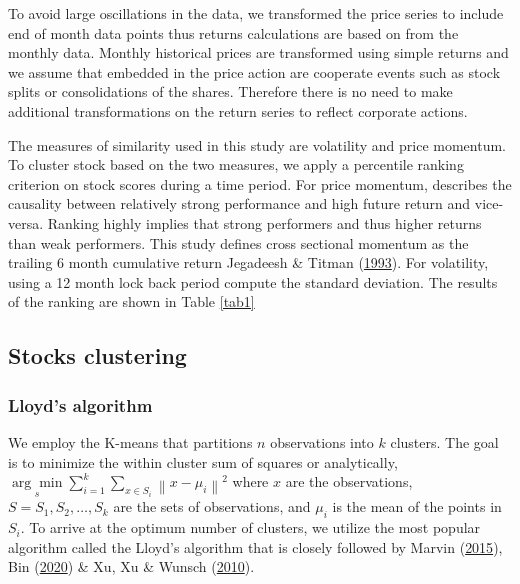 \documentclass[11pt,preprint, authoryear]{elsarticle}
\numberwithin{equation}{section}
\numberwithin{figure}{section}
\numberwithin{table}{section}
\begin{document}
To avoid large oscillations in the data, we transformed the price series
to include end of month data points thus returns calculations are based
on from the monthly data. Monthly historical prices are transformed
using simple returns and we assume that embedded in the price action are
cooperate events such as stock splits or consolidations of the shares.
Therefore there is no need to make additional transformations on the
return series to reflect corporate actions.

The measures of similarity used in this study are volatility and price
momentum. To cluster stock based on the two measures, we apply a
percentile ranking criterion on stock scores during a time period. For
price momentum, describes the causality between relatively strong
performance and high future return and vice-versa. Ranking highly
implies that strong performers and thus higher returns than weak
performers. This study defines cross sectional momentum as the trailing
6 month cumulative return Jegadeesh \& Titman
(\protect\hyperlink{ref-jegadeesh1993returns}{1993}). For volatility,
using a 12 month lock back period compute the standard deviation. The
results of the ranking are shown in Table \ref{tab1}

\hypertarget{stocks-clustering}{%
\subsection{Stocks clustering}\label{stocks-clustering}}

\hypertarget{lloyds-algorithm}{%
\subsubsection{Lloyd's algorithm}\label{lloyds-algorithm}}

We employ the K-means that partitions \(n\) observations into \(k\)
clusters. The goal is to minimize the within cluster sum of squares or
analytically,
\(\underset{s}{\arg \min } \sum_{i=1}^k \sum_{x \in S_i}\left\|x-\mu_i\right\|^2\)
where \(x\) are the observations, \(S=S_1, S_2, \ldots, S_k\) are the
sets of observations, and \(\mu_i\) is the mean of the points in
\(S_i\). To arrive at the optimum number of clusters, we utilize the
most popular algorithm called the Lloyd's algorithm that is closely
followed by Marvin (\protect\hyperlink{ref-marvin2015creating}{2015}),
Bin (\protect\hyperlink{ref-bin2020k}{2020}) \& Xu, Xu \& Wunsch
(\protect\hyperlink{ref-xu2010clustering}{2010}).
\end{document}
